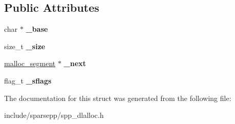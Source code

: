 \subsection*{Public Attributes}
\begin{DoxyCompactItemize}
\item 
char $\ast$ {\bfseries \+\_\+base}\hypertarget{structspp_1_1malloc__segment_ab4aa88a386dd26d7ab8f65831718489a}{}\label{structspp_1_1malloc__segment_ab4aa88a386dd26d7ab8f65831718489a}

\item 
size\+\_\+t {\bfseries \+\_\+size}\hypertarget{structspp_1_1malloc__segment_adca7152fdf9d1e4f3bf2e7771be60432}{}\label{structspp_1_1malloc__segment_adca7152fdf9d1e4f3bf2e7771be60432}

\item 
\hyperlink{structspp_1_1malloc__segment}{malloc\+\_\+segment} $\ast$ {\bfseries \+\_\+next}\hypertarget{structspp_1_1malloc__segment_af62c57b96e821dc2794e018b16b12c83}{}\label{structspp_1_1malloc__segment_af62c57b96e821dc2794e018b16b12c83}

\item 
flag\+\_\+t {\bfseries \+\_\+sflags}\hypertarget{structspp_1_1malloc__segment_a4460f36a948854567cff5b1b74697805}{}\label{structspp_1_1malloc__segment_a4460f36a948854567cff5b1b74697805}

\end{DoxyCompactItemize}


The documentation for this struct was generated from the following file\+:\begin{DoxyCompactItemize}
\item 
include/sparsepp/spp\+\_\+dlalloc.\+h\end{DoxyCompactItemize}
